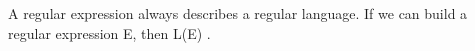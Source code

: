     A regular expression always describes a regular language. If we can build a regular expression E, then L(E) \elem \REG. \newline
